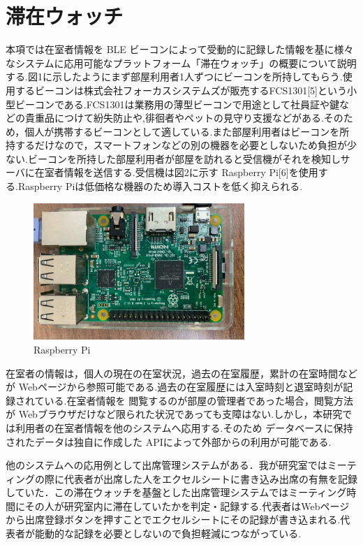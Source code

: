 \documentclass[a4j,8pt,twocolumn]{extarticle}
\begin{document}
\section{滞在ウォッチ}
本項では在室者情報を BLE ビーコンによって受動的に記録した情報を基に様々なシステムに応用可能なプラットフォーム「滞在ウォッチ」の概要について説明する.図1に示したようにまず部屋利用者1人ずつにビーコンを所持してもらう.使用するビーコンは株式会社フォーカスシステムズが販売するFCS1301[5]という小型ビーコンである.FCS1301は業務用の薄型ビーコンで用途として社員証や鍵などの貴重品につけて紛失防止や,徘徊者やペットの見守り支援などがある.そのため，個人が携帯するビーコンとして適している.また部屋利用者はビーコンを所持するだけなので，スマートフォンなどの別の機器を必要としないため負担が少ない.ビーコンを所持した部屋利用者が部屋を訪れると受信機がそれを検知しサーバに在室者情報を送信する.受信機は図2に示す Raspberry Pi[6]を使用する.Raspberry Piは低価格な機器のため導入コストを低く抑えられる.
\begin{figure}[tbh]
    \centering
    \includegraphics[width=8cm]{ras.jpg}
    \caption{Raspberry Pi}
    \label{multipleBPM}
\end{figure}

在室者の情報は，個人の現在の在室状況，過去の在室履歴，累計の在室時間などが Webページから参照可能である.過去の在室履歴には入室時刻と退室時刻が記録されている.在室者情報を 閲覧するのが部屋の管理者であった場合，閲覧方法が Webブラウザだけなど限られた状況であっても支障はない.しかし，本研究では利用者の在室者情報を他のシステムへ応用する.そのため データベースに保持されたデータは独自に作成した APIによって外部からの利用が可能である.

他のシステムへの応用例として出席管理システムがある．我が研究室ではミーティングの際に代表者が出席した人をエクセルシートに書き込み出席の有無を記録していた．この滞在ウォッチを基盤とした出席管理システムではミーティング時間にその人が研究室内に滞在していたかを判定・記録する.代表者はWebページから出席登録ボタンを押すことでエクセルシートにその記録が書き込まれる.代表者が能動的な記録を必要としないので負担軽減につながっている.
\end{document}
